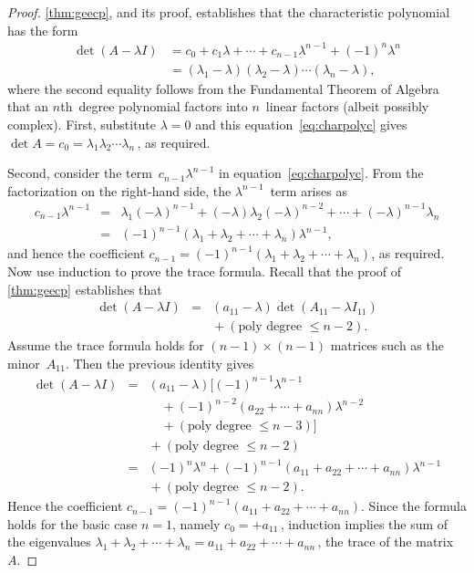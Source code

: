 \begin{proof} 
\autoref{thm:geecp}, and its proof, establishes that the characteristic polynomial has the form
\begin{align}
\det(A-\lambda I)&=c_0+c_1\lambda+\cdots+c_{n-1}\lambda^{n-1}+(-1)^n\lambda^n
\nonumber\\&=(\lambda_1-\lambda)(\lambda_2-\lambda)\cdots(\lambda_n-\lambda),
\label{eq:charpolyc}
\end{align}
where the second equality follows from the Fundamental Theorem of Algebra that an \(n\)th~degree polynomial factors into \(n\)~linear factors (albeit possibly complex).
First, substitute \(\lambda=0\) and this equation~\eqref{eq:charpolyc} gives \(\det A=c_0=\lambda_1\lambda_2\cdots\lambda_n\)\,, as required.

Second, consider the term~\(c_{n-1}\lambda^{n-1}\) in equation~\eqref{eq:charpolyc}.
From the factorization on the right-hand side, the \(\lambda^{n-1}\)~term arises as
\begin{eqnarray*}
c_{n-1}\lambda^{n-1}&=&\lambda_1(-\lambda)^{n-1}
+(-\lambda)\lambda_2(-\lambda)^{n-2}
+\cdots+(-\lambda)^{n-1}\lambda_n
\\&=&(-1)^{n-1}(\lambda_1+\lambda_2+\cdots+\lambda_n)\lambda^{n-1},
\end{eqnarray*}
and hence the coefficient \(c_{n-1}=(-1)^{n-1}(\lambda_1+\lambda_2+\cdots+\lambda_n)\), as required.
Now use induction to prove the trace formula.
Recall that the proof of \autoref{thm:geecp} establishes that
\begin{eqnarray*}
\det(A-\lambda I)
&=&(a_{11}-\lambda)\det (A_{11}-\lambda I_{11})
\\&&{}
+(\text{poly degree }\leq n-2).
\end{eqnarray*}
Assume the trace formula holds for \((n-1)\times(n-1)\) matrices such as the minor~\(A_{11}\). Then the previous identity gives
\begin{eqnarray*}
\det(A-\lambda I)
&=&(a_{11}-\lambda)\big[(-1)^{n-1}\lambda^{n-1}
\\&&\quad{}
+(-1)^{n-2}(a_{22}+\cdots+a_{nn})\lambda^{n-2} 
\\&&\quad{}
+(\text{poly degree }\leq n-3)\big]
\\&&{}
+(\text{poly degree }\leq n-2)
\\&=&(-1)^{n}\lambda^{n}
+(-1)^{n-1}(a_{11}+a_{22}+\cdots+a_{nn})\lambda^{n-1} 
\\&&{}
+(\text{poly degree }\leq n-2).
\end{eqnarray*}
Hence the coefficient \(c_{n-1}=(-1)^{n-1}(a_{11}+a_{22}+\cdots+a_{nn})\).
Since the formula holds for the basic case \(n=1\), namely \(c_0=+a_{11}\)\,, induction implies the sum of the eigenvalues
\(\lambda_1+\lambda_2+\cdots+\lambda_n=a_{11}+a_{22}+\cdots+a_{nn}\)\,, the trace of the matrix~\(A\).
\end{proof}


